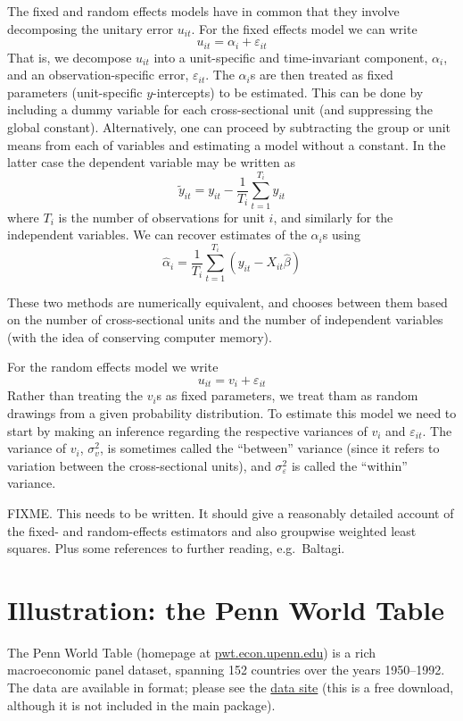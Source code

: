 The fixed and random effects models have in common that they involve
decomposing the unitary error $u_{it}$.  For the fixed effects model we
can write
\[
u_{it} = \alpha_i + \varepsilon_{it}
\]
That is, we decompose $u_{it}$ into a unit-specific and time-invariant
component, $\alpha_i$, and an observation-specific error,
$\varepsilon_{it}$.  The $\alpha_i$s are then treated as fixed
parameters (unit-specific $y$-intercepts) to be estimated.  This can
be done by including a dummy variable for each cross-sectional unit
(and suppressing the global constant).  Alternatively, one can proceed
by subtracting the group or unit means from each of variables and
estimating a model without a constant.  In the latter case
the dependent variable may be written as
\[
\tilde{y}_{it} = y_{it} - \frac{1}{T_i} \sum_{t=1}^{T_i} y_{it}
\]
where $T_i$ is the number of observations for unit $i$,
and similarly for the independent variables.  We can recover
estimates of the $\alpha_i$s using
\[
\hat{\alpha}_i = \frac{1}{T_i} \sum_{t=1}^{T_i} 
   \left(y_{it} - X_{it}\hat{\beta}\right)
\]

These two methods are numerically equivalent, and  chooses
between them based on the number of cross-sectional units and the
number of independent variables (with the idea of conserving computer
memory).

For the random effects model we write
\[
u_{it} = v_i + \varepsilon_{it}
\]
Rather than treating the $v_i$s as fixed parameters, we treat tham as
random drawings from a given probability distribution.  To estimate
this model we need to start by making an inference regarding the
respective variances of $v_i$ and $\varepsilon_{it}$.  The variance
of $v_i$, $\sigma^2_v$, is sometimes called the ``between'' variance
(since it refers to variation between the cross-sectional units), and 
$\sigma^2_{\varepsilon}$ is called the ``within'' variance.


FIXME.  This needs to be written.  It should give a reasonably
detailed account of the fixed- and random-effects estimators and also
groupwise weighted least squares.  Plus some references to further
reading, e.g.\ Baltagi.


\section{Illustration: the Penn World Table}
\label{PWT}

The Penn World Table (homepage at
\href{http://pwt.econ.upenn.edu/}{pwt.econ.upenn.edu}) is a rich
macroeconomic panel dataset, spanning 152 countries over the years
1950--1992.  The data are available in  format; please see
the 
\href{http://gretl.sourceforge.net/gretl_data.html}{data site} (this
is a free download, although it is not included in the main
 package).

